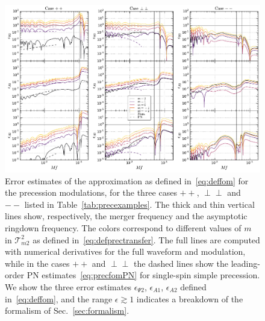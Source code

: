 \documentclass[aps,showpacs,twocolumn,
prd,superscriptaddress,nofootinbib]{revtex4-1}
\newcommand\calT{{\mathcal{T}}}
\begin{document}
\begin{figure}
  \centering
  \includegraphics[width=.98\linewidth]{plots/precfom_py.pdf}
  \caption{Error estimates of the approximation as defined in~\eqref{eq:deffom} for the precession modulations, for the three cases $++$, $\perp\perp$ and $--$ listed in Table~\ref{tab:precexamples}. The thick and thin vertical lines show, respectively, the merger frequency and the asymptotic ringdown frequency. The colors correspond to different values of $m$ in $\calT^{2}_{m 2}$ as defined in~\eqref{eq:defprectransfer}. The full lines are computed with numerical derivatives for the full waveform and modulation, while in the cases $++$ and $\perp\perp$ the dashed lines show the leading-order PN estimates~\eqref{eq:precfomPN} for single-spin simple precession. We show the three error estimates $\epsilon_{\Psi 2}$, $\epsilon_{A1}$, $\epsilon_{A2}$ defined in~\eqref{eq:deffom}, and the range $\epsilon \gtrsim 1$ indicates a breakdown of the formalism of Sec.~\ref{sec:formalism}.}
  \label{fig:fomprec}
\end{figure}
\end{document}
